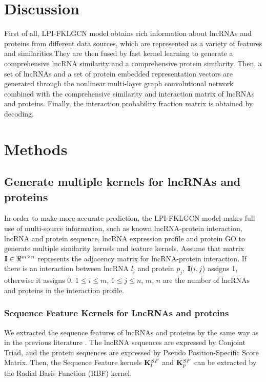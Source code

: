 \documentclass[fleqn,10pt]{wlscirep}
\begin{document}
\section*{Discussion}
First of all, LPI-FKLGCN model obtains rich information about lncRNAs and proteins from different data sources, which are represented as a variety of features and similarities.They are then fused by fast kernel learning to generate a comprehensive lncRNA similarity and a comprehensive protein similarity. Then, a set of lncRNAs and a set of protein embedded representation vectors are generated through the nonlinear multi-layer graph convolutional network combined with the comprehensive similarity and interaction matrix of lncRNAs and proteins. Finally, the interaction probability fraction matrix is obtained by decoding.

\section*{Methods}
\subsection*{Generate multiple kernels for lncRNAs and proteins}
In order to make more accurate prediction, the LPI-FKLGCN model makes full use of multi-source information, such as known lncRNA-protein interaction, lncRNA and protein sequence, lncRNA expression profile and protein GO to generate multiple similarity kernels and feature kernels. Assume that matrix ${\bf{I}} \in {\Re ^{m \times n}}$ represents the adjacency matrix for lncRNA-protein interaction. If there is an interaction between lncRNA ${{l_i}}$ and protein ${{p_j}}$, ${\bf{I}}(i,j)$ assigns 1, otherwise it assigns 0. $1 \le i \le m$, $1 \le j \le n$, $m$, $n$ are the number of lncRNAs and proteins in the interaction profile.

\subsubsection*{Sequence Feature Kernels for LncRNAs and proteins}
We extracted the sequence features of lncRNAs and proteins by the same way as in the previous literature \cite{Shen2019}. The lncRNA sequences are expressed by Conjoint Triad, and the protein sequences are expressed by Pseudo Position-Specific Score Matrix. Then, the Sequence Feature kernels ${\bf{K}}_l^{SF}$ and ${\bf{K}}_p^{SF}$ can be extracted by the Radial Basis Function (RBF) kernel.
\end{document}
